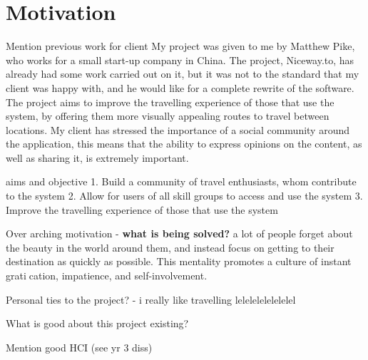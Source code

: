 \section{Motivation}

{\color{red} Mention previous work for client
My project was given to me by Matthew Pike, who works for a small start-up company in China. The project,
Niceway.to, has already had some work carried out on it, but it was not to the standard that my client was
happy with, and he would like for a complete rewrite of the software. The project aims to improve the
travelling experience of those that use the system, by offering them more visually appealing routes to travel
between locations. My client has stressed the importance of a social community around the application, this
means that the ability to express opinions on the content, as well as sharing it, is extremely important.
}

{\color{red} aims and objective
1. Build a community of travel enthusiasts, whom contribute to the system
2. Allow for users of all skill groups to access and use the system
3. Improve the travelling experience of those that use the system
}

{\color{red} Over arching motivation - \textbf{what is being solved?}
a lot of people forget about the beauty in the world around them, and instead focus on getting to their destination as quickly as possible. This mentality promotes a culture of instant gratication, impatience, and self-involvement.
}


{\color{red} Personal ties to the project? - i really like travelling lelelelelelelelel}

{\color{red} What is good about this project existing?}

{\color{red} Mention good HCI (see yr 3 diss)}


